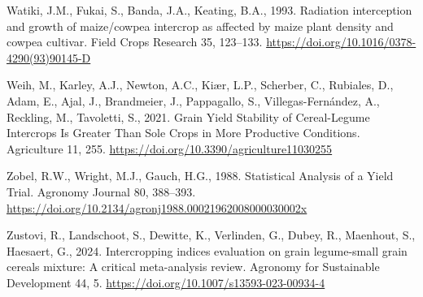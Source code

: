\documentclass[
  british,
  a4paper,
  DIV=11,
  numbers=noendperiod]{scrreprt}
\newlength{\cslhangindent}
\newenvironment{CSLReferences}[2] %
 {\begin{list}{}{%
  \setlength{\itemindent}{0pt}
  \setlength{\leftmargin}{0pt}
  \setlength{\parsep}{0pt}
  \ifodd #1
   \setlength{\leftmargin}{\cslhangindent}
   \setlength{\itemindent}{-1\cslhangindent}
  \fi
  \setlength{\itemsep}{#2\baselineskip}}}
 {\end{list}}
\begin{document}
\begin{CSLReferences}{1}{0}
Watiki, J.M., Fukai, S., Banda, J.A., Keating, B.A., 1993. Radiation
interception and growth of maize/cowpea intercrop as affected by maize
plant density and cowpea cultivar. Field Crops Research 35, 123--133.
\url{https://doi.org/10.1016/0378-4290(93)90145-D}

Weih, M., Karley, A.J., Newton, A.C., Kiær, L.P., Scherber, C.,
Rubiales, D., Adam, E., Ajal, J., Brandmeier, J., Pappagallo, S.,
Villegas-Fernández, A., Reckling, M., Tavoletti, S., 2021. Grain {Yield
Stability} of {Cereal-Legume Intercrops Is Greater Than Sole Crops} in
{More Productive Conditions}. Agriculture 11, 255.
\url{https://doi.org/10.3390/agriculture11030255}

Zobel, R.W., Wright, M.J., Gauch, H.G., 1988. Statistical {Analysis} of
a {Yield Trial}. Agronomy Journal 80, 388--393.
\url{https://doi.org/10.2134/agronj1988.00021962008000030002x}

Zustovi, R., Landschoot, S., Dewitte, K., Verlinden, G., Dubey, R.,
Maenhout, S., Haesaert, G., 2024. Intercropping indices evaluation on
grain legume-small grain cereals mixture: A critical meta-analysis
review. Agronomy for Sustainable Development 44, 5.
\url{https://doi.org/10.1007/s13593-023-00934-4}

\end{CSLReferences}
\end{document}
